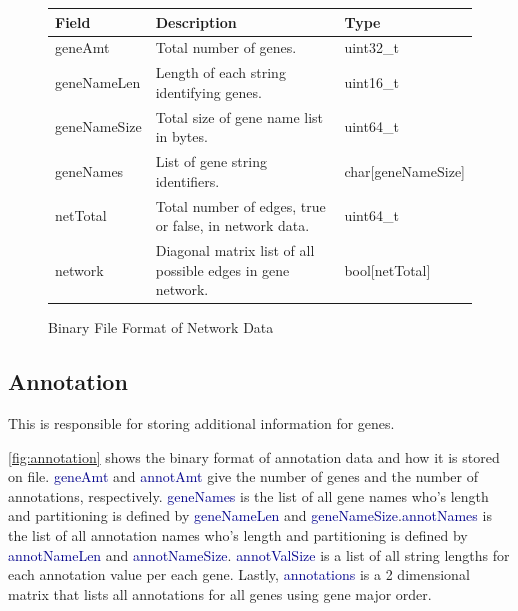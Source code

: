 \documentclass[10pt]{article}
\providecommand{\h}[1]{\textcolor{darkblue}{#1}}
\begin{document}
\begin{figure}[H]
\centering
\begin{tabularx}{\textwidth}{|l|X|l|}
\hline
\textbf{Field} & \textbf{Description} & \textbf{Type} \\
\hline
geneAmt & Total number of genes. & uint32\_t \\
\hline
geneNameLen & Length of each string identifying genes. & uint16\_t \\
\hline
geneNameSize & Total size of gene name list in bytes. & uint64\_t \\
\hline
geneNames & List of gene string identifiers. & char[geneNameSize] \\
\hline
netTotal & Total number of edges, true or false, in network data. & uint64\_t \\
\hline
network & Diagonal matrix list of all possible edges in gene network. & 
bool[netTotal] \\
\hline
\end{tabularx}
\caption{Binary File Format of Network Data}
\label{fig:network}
\end{figure}

\subsection{Annotation}

This is responsible for storing additional information for genes.

\autoref{fig:annotation} shows the binary format of annotation data and how it 
is stored on file. \h{geneAmt} and \h{annotAmt} give the number of genes and 
the number of annotations, respectively. \h{geneNames} is the list of all gene 
names who's length and partitioning is defined by \h{geneNameLen} and 
\h{geneNameSize}.\h{annotNames} is the list of all annotation names who's 
length and partitioning is defined by \h{annotNameLen} and \h{annotNameSize}.
\h{annotValSize} is a list of all string lengths for each annotation value per 
each gene. Lastly, \h{annotations} is a 2 dimensional matrix that lists all 
annotations for all genes using gene major order.
\end{document}
